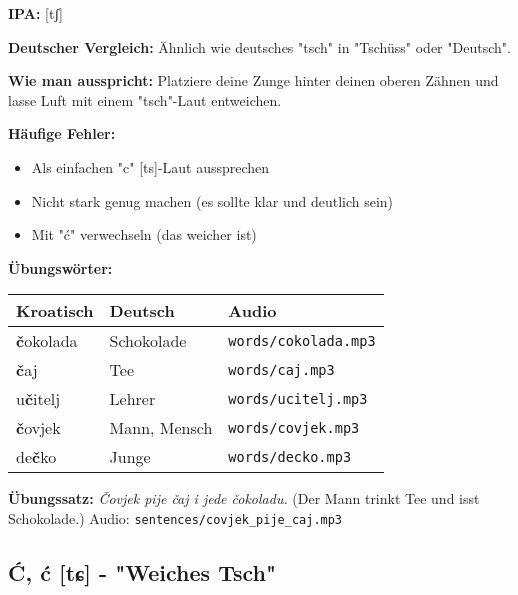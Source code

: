 \begin{tcolorbox}[breakable, colback=lightblue!30, colframe=croatianblue, title=\textbf{Č, č}]

\textbf{IPA:} [tʃ]

\textbf{Deutscher Vergleich:}
Ähnlich wie deutsches "tsch" in "Tschüss" oder "Deutsch".

\textbf{Wie man ausspricht:}
Platziere deine Zunge hinter deinen oberen Zähnen und lasse Luft mit einem "tsch"-Laut entweichen.

\textbf{Häufige Fehler:}
\begin{itemize}
    \item Als einfachen "c" [ts]-Laut aussprechen
    \item Nicht stark genug machen (es sollte klar und deutlich sein)
    \item Mit "ć" verwechseln (das weicher ist)
\end{itemize}

\textbf{Übungswörter:}
\begin{center}
\small
\begin{tabular}{lll}
\textbf{Kroatisch} & \textbf{Deutsch} & \textbf{Audio} \\
\midrule
\textbf{č}okolada & Schokolade & \small\texttt{words/cokolada.mp3} \\
\textbf{č}aj & Tee & \small\texttt{words/caj.mp3} \\
u\textbf{č}itelj & Lehrer & \small\texttt{words/ucitelj.mp3} \\
\textbf{č}ovjek & Mann, Mensch & \small\texttt{words/covjek.mp3} \\
de\textbf{č}ko & Junge & \small\texttt{words/decko.mp3} \\
\end{tabular}
\end{center}

\textbf{Übungssatz:}
\textit{Čovjek pije čaj i jede čokoladu.}
(Der Mann trinkt Tee und isst Schokolade.)
Audio: \small\texttt{sentences/covjek\_pije\_caj.mp3}

\end{tcolorbox}

\subsection{Ć, ć [tɕ] - "Weiches Tsch"}

